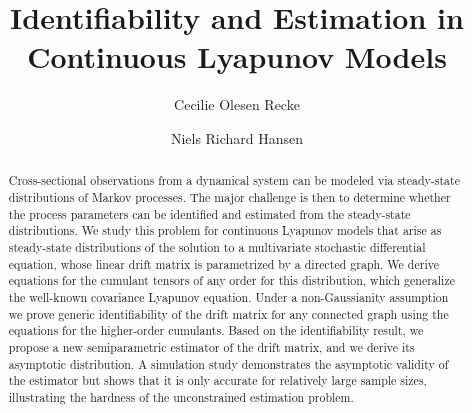 \documentclass{biometrika}
\begin{document}



\title{Identifiability and Estimation in Continuous Lyapunov Models}

\author{Cecilie Olesen Recke}

\author{Niels Richard Hansen}


\maketitle



\begin{abstract}
Cross-sectional observations from a dynamical system can be modeled via 
steady-state distributions of Markov processes. The major challenge is then to determine
whether the process parameters can be identified and estimated from the
steady-state distributions. We study this problem for continuous Lyapunov models
that arise as steady-state distributions of the solution to a multivariate stochastic 
differential equation, whose linear drift matrix is parametrized by a directed graph. 
We derive equations for the cumulant tensors of any order for this distribution, which
generalize the well-known covariance Lyapunov equation. Under a non-Gaussianity assumption
we prove generic identifiability of the drift matrix for any connected graph using the 
equations for the higher-order cumulants. Based on the identifiability result, we propose 
a new semiparametric estimator of the drift matrix, and we derive its asymptotic distribution.
A simulation study demonstrates the asymptotic validity of the estimator 
but shows that it is only accurate for relatively large sample sizes, illustrating the hardness of the unconstrained estimation problem.
\end{abstract}
\end{document}
